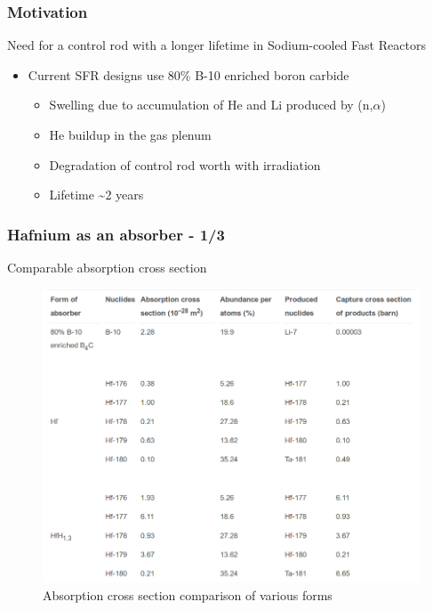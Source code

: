 \documentclass[9pt]{beamer}
\begin{document}
\begin{frame}
\frametitle{Motivation}
Need for a control rod with a longer lifetime in Sodium-cooled Fast Reactors
\begin{itemize}
  \item Current \gls{SFR} designs use 80\% B-10 enriched  boron carbide
  \begin{itemize}
    \item Swelling due to accumulation of He and Li produced by (n,$\alpha$)
    \item He buildup in the gas plenum
    \item Degradation of control rod worth with irradiation
    \item Lifetime \textasciitilde 2 years
  \end{itemize}
\end{itemize}
\end{frame}


\begin{frame}
\frametitle{Hafnium as an absorber - 1/3}
Comparable absorption cross section
\begin{figure}[htbp!]
  \begin{center}
      \includegraphics[scale=0.25]{./images/axs.png}
  \end{center}
  \caption{Absorption cross section comparison of various forms}
  \label{fig:axs}
\end{figure}

\end{frame}
\end{document}
